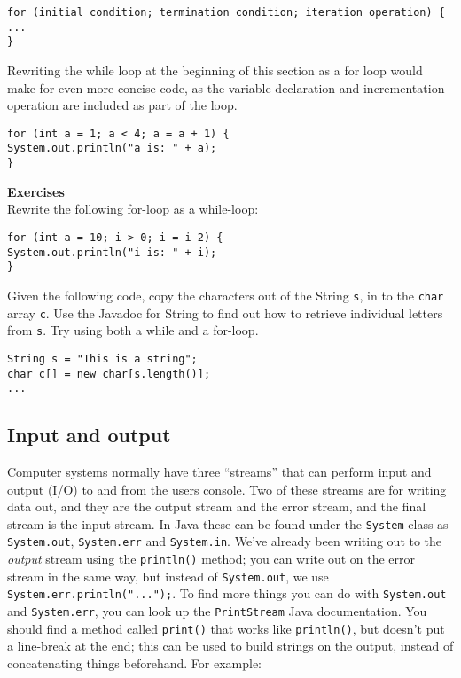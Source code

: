 \begin{verbatim}
for (initial condition; termination condition; iteration operation) {
...
}
\end{verbatim}

\noindent
Rewriting the while loop at the beginning of this section as a for loop would make for even more concise code, as the variable declaration and incrementation operation are included as part of the loop.

\begin{verbatim}
for (int a = 1; a < 4; a = a + 1) {
System.out.println("a is: " + a);
}
\end{verbatim}

\noindent
{\bf Exercises} \\

\noindent
Rewrite the following for-loop as a while-loop:

\begin{verbatim}
for (int a = 10; i > 0; i = i-2) {
System.out.println("i is: " + i);
}
\end{verbatim}

\noindent
Given the following code, copy the characters out of the String {\tt s}, in to the {\tt char} array {\tt c}. Use the Javadoc for String to find out how to retrieve individual letters from {\tt s}. Try using both a while and a for-loop.

\begin{verbatim}
String s = "This is a string";
char c[] = new char[s.length()];
...
\end{verbatim}

\subsection{Input and output}

Computer systems normally have three ``streams'' that can perform input and output (I/O) to and from the users console. Two of these streams are for writing data out, and they are the output stream and the error stream, and the final stream is the input stream. In Java these can be found under the {\tt System} class as {\tt System.out}, {\tt System.err} and {\tt System.in}. We've already been writing out to the \emph{output} stream using the {\tt println()} method; you can write out on the error stream in the same way, but instead of {\tt System.out}, we use {\tt System.err.println("...");}. To find more things you can do with {\tt System.out} and {\tt System.err}, you can look up the {\tt PrintStream} Java documentation. You should find a method called {\tt print()} that works like {\tt println()}, but doesn't put a line-break at the end; this can be used to build strings on the output, instead of concatenating things beforehand. For example:


